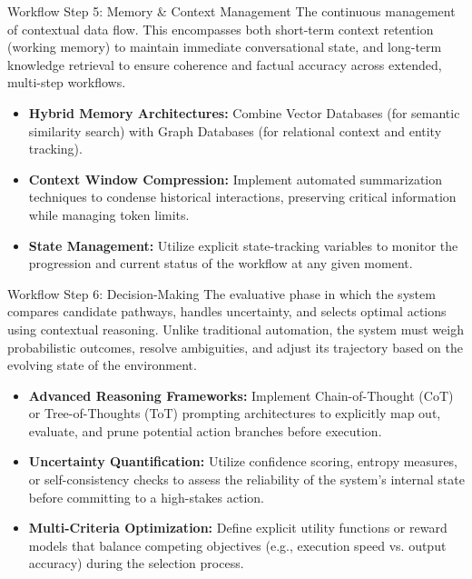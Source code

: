 \documentclass[
11pt,notheorems,hyperref={pdfauthor=whatever}
]{beamer}
\begin{document}
\begin{frame}{Workflow Step 5: Memory \& Context Management}
	The continuous management of contextual data flow. This encompasses both short-term context retention (working memory) to maintain immediate conversational state, and long-term knowledge retrieval to ensure coherence and factual accuracy across extended, multi-step workflows.
	
	\vspace{0.3cm}
	
	\begin{itemize}
		\item \textbf{Hybrid Memory Architectures:} Combine Vector Databases (for semantic similarity search) with Graph Databases (for relational context and entity tracking).
		\item \textbf{Context Window Compression:} Implement automated summarization techniques to condense historical interactions, preserving critical information while managing token limits.
		\item \textbf{State Management:} Utilize explicit state-tracking variables to monitor the progression and current status of the workflow at any given moment.
	\end{itemize}
\end{frame}

\begin{frame}{Workflow Step 6: Decision-Making}
	The evaluative phase in which the system compares candidate pathways, handles uncertainty, and selects optimal actions using contextual reasoning. Unlike traditional automation, the system must weigh probabilistic outcomes, resolve ambiguities, and adjust its trajectory based on the evolving state of the environment.
	
	\vspace{0.3cm}
	
	\begin{itemize}
		\item \textbf{Advanced Reasoning Frameworks:} Implement Chain-of-Thought (CoT) or Tree-of-Thoughts (ToT) prompting architectures to explicitly map out, evaluate, and prune potential action branches before execution.
		\item \textbf{Uncertainty Quantification:} Utilize confidence scoring, entropy measures, or self-consistency checks to assess the reliability of the system's internal state before committing to a high-stakes action.
		\item \textbf{Multi-Criteria Optimization:} Define explicit utility functions or reward models that balance competing objectives (e.g., execution speed vs. output accuracy) during the selection process.
	\end{itemize}
\end{frame}
\end{document}
